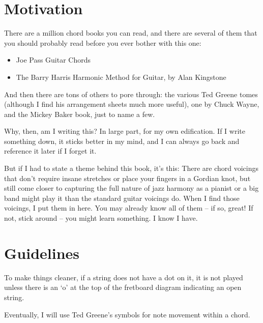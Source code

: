 
\section{Motivation}

There are a million chord books you can read, and there are several of them that you should probably read before you ever bother with this one:

\begin{itemize}
	\item Joe Pass Guitar Chords
	\item The Barry Harris Harmonic Method for Guitar, by Alan Kingstone
\end{itemize}

And then there are tons of others to pore through: the various Ted Greene tomes (although I find his arrangement sheets much more useful), one by Chuck Wayne, and the Mickey Baker book, just to name a few.

Why, then, am I writing this?  In large part, for my own edification.  If I write something down, it sticks better in my mind, and I can always go back and reference it later if I forget it.

But if I had to state a theme behind this book, it's this: There are chord voicings that don't require insane stretches or place your fingers in a Gordian knot, but still come closer to capturing the full nature of jazz harmony as a pianist or a big band might play it than the standard guitar voicings do.  When I find those voicings, I put them in here.  You may already know all of them -- if so, great!  If not, stick around -- you might learn something.  I know I have.

\section{Guidelines}

To make things cleaner, if a string does not have a dot on it, it is not played unless there is an `o' at the top of the fretboard diagram indicating an open string.

Eventually, I will use Ted Greene's symbols for note movement within a chord.